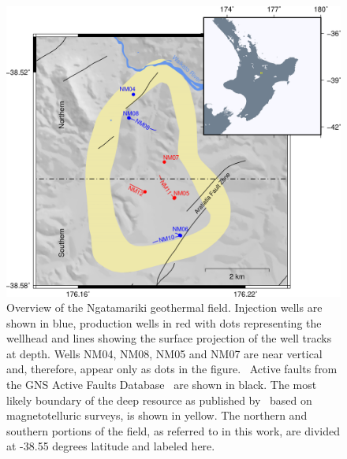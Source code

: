 \begin{figure}[h!]
\begin{center}
\includegraphics[width=0.70\columnwidth]{Chapter_3_Nga/figures/merc_Nga_overview_temps-wells_12-15/merc_Nga_overview_wells_12-15_original}
\caption{{Overview of the Ngatamariki geothermal field. Injection wells are shown
in blue, production wells in red with dots representing the wellhead and
lines showing the surface projection of the well tracks at depth. Wells
NM04, NM08, NM05 and NM07 are near vertical and, therefore, appear only
as dots in the figure.~ Active faults from the GNS Active Faults
Database~\protect\citep{AFDB} are shown in black. The most likely boundary
of the deep resource as published by~\protect\cite{Boseley_2010} based on
magnetotelluric surveys, is shown in yellow. The northern and southern
portions of the field, as referred to in this work, are divided at
-38.55 degrees latitude and labeled here.
{\label{795275}}%
}}
\end{center}
\end{figure}

